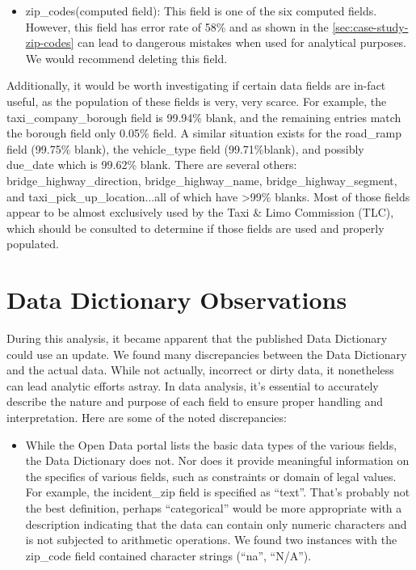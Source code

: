 \documentclass[12pt, titlepage]{article}
\begin{document}
{\begin{itemize}
		    \item zip\_codes(computed field):  This field is one of the six 
		    computed fields.  However, this field has error rate of 58\% and 
		    as shown in the \ref{sec:case-study-zip-codes} can lead to 
		    dangerous mistakes when used for analytical purposes. We would 
		    recommend deleting this field.
	\end{itemize}
 	
Additionally, it would be worth investigating if certain data fields are 
in-fact useful, as the population of these fields is very, very scarce. For 
example, the taxi\_company\_borough field is 99.94\% blank, and the 
remaining entries match the borough field only 0.05\% field. A similar 
situation exists for the road\_ramp field (99.75\% blank), the 
vehicle\_type field (99.71\%blank), and possibly due\_date which 
is 99.62\% blank. There are several others: bridge\_highway\_direction, 
bridge\_highway\_name, bridge\_highway\_segment, and 
taxi\_pick\_up\_location...all of which have \textgreater99\% 
blanks. Most of those fields appear to be almost exclusively used by 
the Taxi \& Limo Commission (TLC), which should be consulted 
to determine if those fields are used and properly populated.   



\section{Data Dictionary Observations} \label{sec:datadictionay}
During this analysis, it became apparent that the published Data 
Dictionary could use an update. We found many discrepancies 
between the Data Dictionary and the actual data. While not actually, 
incorrect or dirty data, it nonetheless can lead analytic efforts astray. In 
data analysis, it's essential to accurately describe the nature and purpose 
of each field to ensure proper handling and interpretation. Here 
are some of the noted discrepancies:  

\begin{itemize}
	\item While the Open Data portal lists the basic data types of the 
	various fields, the Data Dictionary does not. Nor does it provide 
	meaningful information on the specifics of various fields, such 
	as constraints or domain of legal values. For example, the 
	incident\_zip field is specified as ``text''. That's probably not the 
	best definition, perhaps	``categorical'' would be more 
	appropriate with a description indicating that the data can 
	contain only numeric characters and is not subjected to arithmetic 
	operations. We found two instances with the zip\_code field 
	contained character strings (``na'', ``N/A''). 


\end{itemize}}
\end{document}
